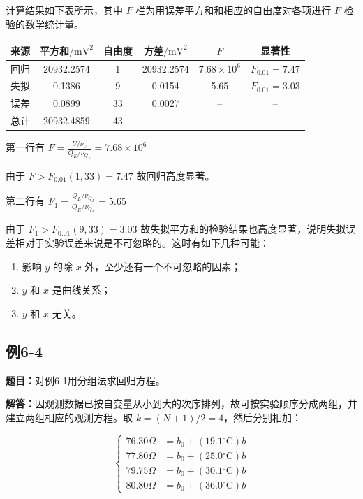 \documentclass[UTF8,zihao=-4]{ctexart}
\newcommand{\problem}[1]{\subsection*{#1}}
\newcommand{\timu}{\noindent\textbf{题目：}}
\newcommand{\jieda}{\noindent\textbf{解答：}}
\begin{document}
计算结果如下表所示，其中 $F$ 栏为用误差平方和和相应的自由度对各项进行 $F$ 检验的数学统计量。

\begin{center}
\small
\setlength{\tabcolsep}{5pt}
\begin{tabular}{c|c|c|c|c|c}
\toprule
来源 & 平方和$/\mathrm{mV}^2$ & 自由度 & 方差$/\mathrm{mV}^2$ & $F$ & 显著性\\
\midrule
回归 & 20932.2574 & 1 & 20932.2574 & $7.68\times10^6$ & $F_{0.01}=7.47$\\
失拟 & 0.1386 & 9 & 0.0154 & 5.65 & $F_{0.01}=3.03$\\
误差 & 0.0899 & 33 & 0.0027 & -- & --\\
总计 & 20932.4859 & 43 & -- & -- & --\\
\bottomrule
\end{tabular}
\end{center}

第一行有 $F = \frac{U/\nu_U}{Q_E/\nu_{Q_E}} = 7.68\times10^6$

由于 $F>F_{0.01}(1,33)=7.47$ 故回归高度显著。

第二行有 $F_1 = \frac{Q_L/\nu_{Q_L}}{Q_E/\nu_{Q_E}} = 5.65$

由于 $F_1>F_{0.01}(9,33)=3.03$ 故失拟平方和的检验结果也高度显著，说明失拟误差相对于实验误差来说是不可忽略的。这时有如下几种可能：
\begin{enumerate}[label=\arabic*)]
    \item 影响 $y$ 的除 $x$ 外，至少还有一个不可忽略的因素；
    \item $y$ 和 $x$ 是曲线关系；
    \item $y$ 和 $x$ 无关。
\end{enumerate}

\problem{例6-4}

\timu 对例6-1用分组法求回归方程。

\jieda 因观测数据已按自变量从小到大的次序排列，故可按实验顺序分成两组，并建立两组相应的观测方程。取 $k=(N+1)/2=4$，然后分别相加：

\begin{equation*}
\left\{
\begin{aligned}
    76.30\Omega&=b_0+(19.1{}^\circ\mathrm{C})b\\
    77.80\Omega&=b_0+(25.0{}^\circ\mathrm{C})b\\
    79.75\Omega&=b_0+(30.1{}^\circ\mathrm{C})b\\
    80.80\Omega&=b_0+(36.0{}^\circ\mathrm{C})b
\end{aligned}
\right.
\end{equation*}
\end{document}
